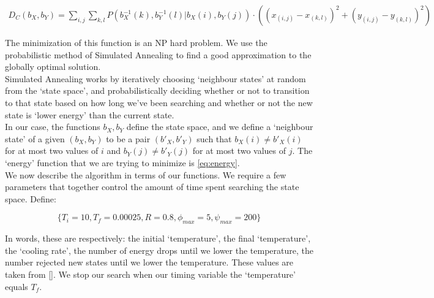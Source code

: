 \documentclass[10pt]{article}
\begin{document}
\begin{align}
    \label{eq:energy}
    D_C(b_X,b_Y)=
        \sum_{i,j}
            \sum_{k,l}
            P(b_X^{-1}(k), b_Y^{-1}(l) | b_X(i), b_Y(j))\cdot
            \left((x_{(i,j)}-x_{(k,l)})^2+(y_{(i,j)}-y_{(k,l)})^2\right)
\end{align}

The minimization of this function is an NP hard problem. We use the probabilistic method of Simulated Annealing to find a good approximation to the globally optimal solution.\\

Simulated Annealing works by iteratively choosing `neighbour states' at random from the `state space', and probabilistically deciding whether or not to transition to that state based on how long we've been searching and whether or not the new state is `lower energy' than the current state.\\

In our case, the functions $b_X,b_Y$ define the state space, and we define a `neighbour state' of a given $(b_X, b_Y)$ to be a pair $(b'_X, b'_Y)$ such that $b_X(i)\neq b'_X(i)$ for at most two values of $i$ and $b_Y(j)\neq b'_Y(j)$ for at most two values of $j$. The `energy' function that we are trying to minimize is \eqref{eq:energy}.\\

We now describe the algorithm in terms of our functions. We require a few parameters that together control the amount of time spent searching the state space. Define:

\begin{equation}
    \{T_i=10,T_f=0.00025,R=0.8,\phi_{max}=5,\psi_{max}=200\}
\end{equation}

In words, these are respectively: the initial `temperature', the final `temperature', the `cooling rate', the number of energy drops until we lower the temperature, the number rejected new states until we lower the temperature. These values are taken from \ref{}. We stop our search when our timing variable the `temperature' equals $T_f$.
\end{document}
